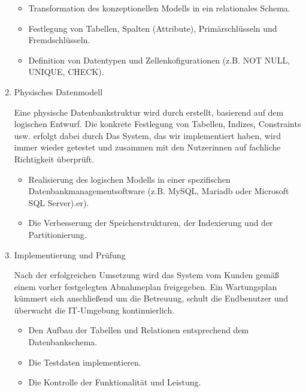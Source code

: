 \begin{enumerate}
\begin{itemize}
\item Transformation des konzeptionellen Modells in ein relationales Schema.
\item Festlegung von Tabellen, Spalten (Attribute), Primärschlüsseln und Fremdschlüsseln.
\item Definition von Datentypen und Zellenkofigurationen (z.B. NOT NULL, UNIQUE, CHECK).
\end{itemize}

\item
Physisches Datenmodell

Eine physische Datenbankstruktur wird durch  erstellt, basierend auf dem logischen Entwurf.
Die konkrete Festlegung von Tabellen, Indizes, Constraints usw. erfolgt dabei durch  Das System,
das wir implementiert haben, wird immer wieder getestet und zusammen mit den Nutzerinnen auf fachliche Richtigkeit überprüft.
\begin{itemize}

\item Realisierung des logischen Modells in einer spezifischen Datenbankmanagementsoftware (z.B. MySQL, Mariadb oder Microsoft SQL Server).er).
\item Die Verbesserung der Speicherstrukturen, der Indexierung und der Partitionierung.

\end{itemize}

\item
Implementierung und Prüfung

Nach der erfolgreichen Umsetzung wird das System vom Kunden gemäß einem vorher festgelegten Abnahmeplan freigegeben.
Ein Wartungsplan kümmert sich anschließend um die Betreuung, schult die Endbenutzer und überwacht die IT-Umgebung kontinuierlich.
\begin{itemize}

\item Den Aufbau der Tabellen und Relationen entsprechend dem Datenbankschema.

\item Die Testdaten implementieren.

\item Die Kontrolle der Funktionalität und Leistung.

\end{itemize}

\end{enumerate}

\pagebreak
